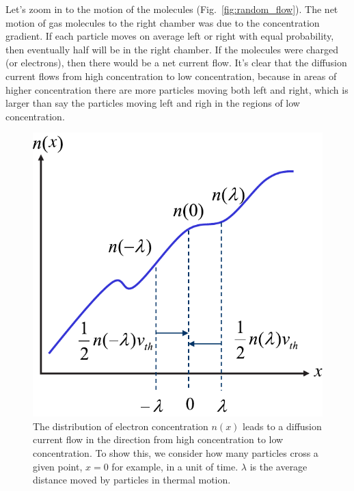 Let’s zoom in to the motion of the molecules (Fig.~\ref{fig:random_flow}).  The net motion of gas molecules to the right chamber was due to the concentration gradient.
If each particle moves on average left or right with equal probability, then eventually half will be in the right chamber. If the molecules were charged (or electrons), then there would be a net current flow.  It's clear that the diffusion current flows from high concentration to low concentration, because in areas of higher concentration there are more particles moving both left and right, which is larger than say the particles moving left and righ in the regions of low concentration.
\begin{figure}[tb]
\begin{center}
\includegraphics[width=.45\columnwidth]{slide48}
\end{center}
\caption{The distribution of electron concentration $n(x)$ leads to a diffusion current flow in the direction from high concentration to low concentration.  To show this, we consider how many particles cross a given point, $x=0$ for example, in a unit of time.  $\lambda$ is the average distance moved by particles in thermal motion. }
\label{fig:slide48}
\end{figure}
